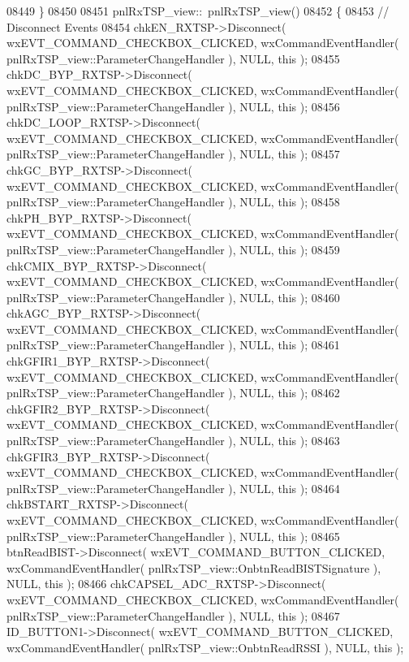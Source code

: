 \begin{DoxyCode}
08449 \}
08450 
08451 pnlRxTSP_view::~pnlRxTSP_view()
08452 \{
08453     \textcolor{comment}{// Disconnect Events}
08454     chkEN_RXTSP->Disconnect( wxEVT\_COMMAND\_CHECKBOX\_CLICKED, wxCommandEventHandler( 
      pnlRxTSP_view::ParameterChangeHandler ), NULL, \textcolor{keyword}{this} );
08455     chkDC_BYP_RXTSP->Disconnect( wxEVT\_COMMAND\_CHECKBOX\_CLICKED, wxCommandEventHandler( 
      pnlRxTSP_view::ParameterChangeHandler ), NULL, \textcolor{keyword}{this} );
08456     chkDC_LOOP_RXTSP->Disconnect( wxEVT\_COMMAND\_CHECKBOX\_CLICKED, wxCommandEventHandler( 
      pnlRxTSP_view::ParameterChangeHandler ), NULL, \textcolor{keyword}{this} );
08457     chkGC_BYP_RXTSP->Disconnect( wxEVT\_COMMAND\_CHECKBOX\_CLICKED, wxCommandEventHandler( 
      pnlRxTSP_view::ParameterChangeHandler ), NULL, \textcolor{keyword}{this} );
08458     chkPH_BYP_RXTSP->Disconnect( wxEVT\_COMMAND\_CHECKBOX\_CLICKED, wxCommandEventHandler( 
      pnlRxTSP_view::ParameterChangeHandler ), NULL, \textcolor{keyword}{this} );
08459     chkCMIX_BYP_RXTSP->Disconnect( wxEVT\_COMMAND\_CHECKBOX\_CLICKED, wxCommandEventHandler( 
      pnlRxTSP_view::ParameterChangeHandler ), NULL, \textcolor{keyword}{this} );
08460     chkAGC_BYP_RXTSP->Disconnect( wxEVT\_COMMAND\_CHECKBOX\_CLICKED, wxCommandEventHandler( 
      pnlRxTSP_view::ParameterChangeHandler ), NULL, \textcolor{keyword}{this} );
08461     chkGFIR1_BYP_RXTSP->Disconnect( wxEVT\_COMMAND\_CHECKBOX\_CLICKED, wxCommandEventHandler( 
      pnlRxTSP_view::ParameterChangeHandler ), NULL, \textcolor{keyword}{this} );
08462     chkGFIR2_BYP_RXTSP->Disconnect( wxEVT\_COMMAND\_CHECKBOX\_CLICKED, wxCommandEventHandler( 
      pnlRxTSP_view::ParameterChangeHandler ), NULL, \textcolor{keyword}{this} );
08463     chkGFIR3_BYP_RXTSP->Disconnect( wxEVT\_COMMAND\_CHECKBOX\_CLICKED, wxCommandEventHandler( 
      pnlRxTSP_view::ParameterChangeHandler ), NULL, \textcolor{keyword}{this} );
08464     chkBSTART_RXTSP->Disconnect( wxEVT\_COMMAND\_CHECKBOX\_CLICKED, wxCommandEventHandler( 
      pnlRxTSP_view::ParameterChangeHandler ), NULL, \textcolor{keyword}{this} );
08465     btnReadBIST->Disconnect( wxEVT\_COMMAND\_BUTTON\_CLICKED, wxCommandEventHandler( 
      pnlRxTSP_view::OnbtnReadBISTSignature ), NULL, \textcolor{keyword}{this} );
08466     chkCAPSEL_ADC_RXTSP->Disconnect( wxEVT\_COMMAND\_CHECKBOX\_CLICKED, wxCommandEventHandler( 
      pnlRxTSP_view::ParameterChangeHandler ), NULL, \textcolor{keyword}{this} );
08467     ID_BUTTON1->Disconnect( wxEVT\_COMMAND\_BUTTON\_CLICKED, wxCommandEventHandler( 
      pnlRxTSP_view::OnbtnReadRSSI ), NULL, \textcolor{keyword}{this} );

\end{DoxyCode}
